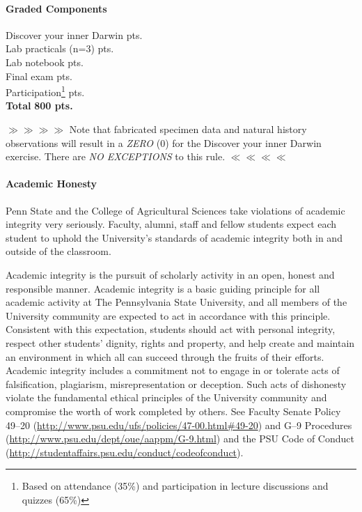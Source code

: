 \documentclass[11pt]{article}
\begin{document}
\paragraph{Graded Components}
\begin{center} \begin{minipage}{3.8in}
\begin{flushleft}
Discover your inner Darwin    pts.  \\
Lab practicals (n=3)    pts.  \\
Lab notebook  pts.\\
Final exam    pts.  \\
Participation\footnote{Based on attendance (35\%) and participation in lecture discussions and quizzes (65\%)}     pts.  \\
\textbf{Total}   \dotfill \textbf{800 pts.} 
\end{flushleft}
\end{minipage}
\end{center}
$\gg\gg\gg\gg$ Note that fabricated specimen data and natural history observations will result in a \textit{ZERO} (0) for the Discover your inner Darwin exercise. There are \textit{NO EXCEPTIONS} to this rule. $\ll\ll\ll\ll$

\paragraph{Academic Honesty} Penn State and the College of Agricultural Sciences take violations of academic integrity very seriously. Faculty, alumni, staff and fellow students expect each student to uphold the University's standards of academic integrity both in and outside of the classroom.

Academic integrity is the pursuit of scholarly activity in an open, honest and responsible manner. Academic integrity is a basic guiding principle for all academic activity at The Pennsylvania State University, and all members of the University community are expected to act in accordance with this principle. Consistent with this expectation, students should act with personal integrity, respect other students' dignity, rights and property, and help create and maintain an environment in which all can succeed through the fruits of their efforts. Academic integrity includes a commitment not to engage in or tolerate acts of falsification, plagiarism, misrepresentation or deception. Such acts of dishonesty violate the fundamental ethical principles of the University community and compromise the worth of work completed by others. See Faculty Senate Policy 49--20 (\url{http://www.psu.edu/ufs/policies/47-00.html#49-20}) and G--9 Procedures (\url{http://www.psu.edu/dept/oue/aappm/G-9.html}) and the PSU Code of Conduct (\url{http://studentaffairs.psu.edu/conduct/codeofconduct}).
\end{document}
